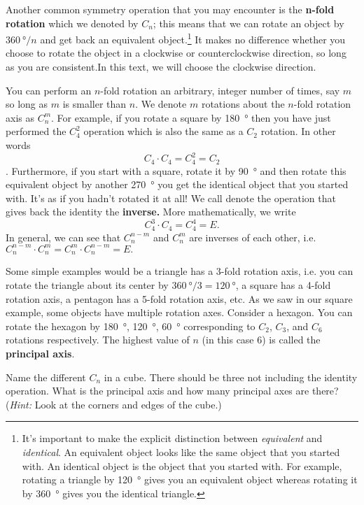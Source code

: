         Another common symmetry operation that you may encounter is the \textbf{n-fold rotation} which we denoted by $C_n$; this means that we can rotate an object by $\SI{360}{\degree}/n$ and get back an equivalent object.\footnote{It's important to make the explicit distinction between \emph{equivalent} and \emph{identical}. An equivalent object looks like the same object that you started with. An identical object is the object that you started with. For example, rotating a triangle by \SI{120}{\degree} gives you an equivalent object whereas rotating it by \SI{360}{\degree} gives you the identical triangle.} It makes no difference whether you choose to rotate the object in a clockwise or counterclockwise direction, so long as you are consistent.In this text, we will choose the clockwise direction. 

        You can perform an $n$-fold rotation an arbitrary, integer number of times, say $m$ so long as $m$ is smaller than $n.$ We denote $m$ rotations about the $n$-fold rotation axis as $C^m_n$.  For example, if you rotate a square by \SI{180}{\degree} then you have just performed the $C^2_4$ operation which is also the same as a $C_2$ rotation. In other words \[ C_4 \cdot C_4 = C^2_4 = C_2\]. Furthermore, if you start with a square, rotate it by \SI{90}{\degree} and then rotate this equivalent object by another \SI{270}{\degree} you get the identical object that you started with. It's as if you hadn't rotated it at all! We call denote the operation that gives back the identity the \textbf{inverse.} More mathematically, we write \[C^3_4 \cdot C_4 = C^4_4 = E.\] In general, we can see that $C^{n-m}_n$ and $C^m_n$ are inverses of each other, i.e. $C^{n-m}_n \cdot C^m_n = C^{m}_n \cdot C^{n-m}_n = E.$ 

        Some simple examples would be a triangle has a 3-fold rotation axis, i.e. you can rotate the triangle about its center by $\SI{360}{\degree}/3 = \SI{120}{\degree}$, a square has a 4-fold rotation axis, a pentagon has a 5-fold rotation axis, etc. As we saw in our square example, some objects have multiple rotation axes. Consider a hexagon. You can rotate the hexagon by \SI{180}{\degree}, \SI{120}{\degree}, \SI{60}{\degree} corresponding to $C_2$, $C_3$, and $C_6$ rotations respectively. The highest value of $n$ (in this case 6) is called the \textbf{principal axis}. 

        \begin{exercise}
            Name the different $C_n$ in a cube. There should be three not including the identity operation. What is the principal axis and how many principal axes are there? (\emph{Hint:} Look at the corners and edges of the cube.)
        \end{exercise}

